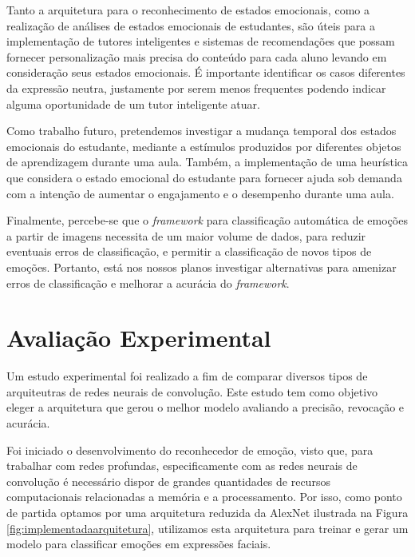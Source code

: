 Tanto a arquitetura para o reconhecimento de estados emocionais, como a
realização de análises de estados emocionais de estudantes, são úteis para a implementação de tutores inteligentes e sistemas de recomendações que possam fornecer personalização mais precisa do conteúdo para cada aluno levando em consideração seus estados emocionais. É importante identificar os casos diferentes da expressão neutra, justamente por serem menos frequentes podendo indicar alguma oportunidade de um tutor inteligente atuar.

Como trabalho futuro, pretendemos investigar a mudança temporal dos estados emocionais do estudante, mediante a estímulos produzidos por diferentes objetos de aprendizagem durante uma aula. Também, a implementação de uma heurística que considera o estado emocional do estudante para fornecer ajuda sob demanda com a intenção de aumentar o engajamento e o desempenho durante uma aula.

Finalmente, percebe-se que o \textit{framework} para classificação automática de emoções a partir de imagens necessita de um maior volume de dados, para reduzir eventuais erros de classificação, e permitir a classificação de novos tipos de emoções. Portanto, está nos nossos planos investigar alternativas para amenizar erros de classificação e melhorar a acurácia do \textit{framework}.

\section{Avaliação Experimental}\label{sec:avalexp}

Um estudo experimental foi realizado a fim de comparar diversos tipos de arquiteutras de redes neurais de convolução. Este estudo tem como objetivo eleger a arquitetura que gerou o melhor modelo avaliando a precisão, revocação e acurácia.  


Foi iniciado o desenvolvimento do reconhecedor de emoção, visto que, para trabalhar com redes profundas, especificamente com as redes neurais de convolução é necessário dispor de grandes quantidades de recursos computacionais relacionadas a memória e a processamento. Por isso, como ponto de partida optamos por uma arquitetura reduzida da AlexNet ilustrada na Figura \ref{fig:implementadaarquitetura}, utilizamos esta arquitetura para treinar e gerar um modelo para classificar emoções em expressões faciais.

